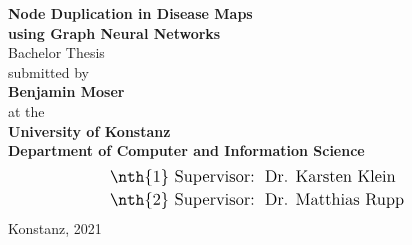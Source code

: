 \documentclass[
	fontsize=10pt, %
	twoside=true, %
	secnumdepth=1, %
  toc=indentunnumbered %
]{kaobook}
\begin{document}
\begin{titlepage}
  \begin{center}
    {\LARGE \textbf{Node Duplication in Disease Maps \\[0.7em] using Graph Neural Networks}}
    \\[2em]
    {\Large {Bachelor Thesis}}
    \\[5.5em]
    {\Large submitted by}
    \\[1.5em]
    {\LARGE \textbf{Benjamin Moser}}
    \\[1.5em]
    {\Large at the}
    \\[1.2em]
    {\Large \textbf{University of Konstanz}}
    \\[1.0em]
    {\Large \textbf{Department of Computer and Information Science}}
    \\[4em]
    \begin{align*}
      \text{\large {\nth{1} Supervisor}:~} &  \text{ \large Dr. Karsten Klein } \\
      \text{\large {\nth{2} Supervisor}:~} &  \text{ \large Dr. Matthias Rupp } \\
    \end{align*}
    \vfill
    {\Large {Konstanz, 2021}}
  \end{center}
\end{titlepage}











\frontmatter %


\end{document}
